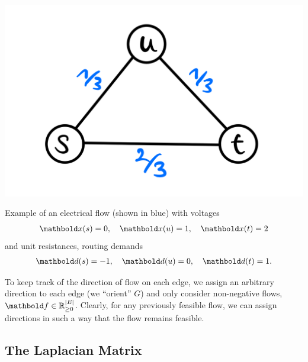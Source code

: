 \begin{marginfigure}
    \includegraphics[width=\textwidth]{notes/figures/electrical_flows.png}
    \caption{Example of an electrical flow (shown in blue) with voltages \begin{align*}
        \vx(s) = 0,\quad \vx(u) = 1,\quad \vx(t) = 2
    \end{align*} and unit resistances, routing demands \begin{align*}
        \vd(s) = -1,\quad \vd(u) = 0,\quad \vd(t) = 1.
    \end{align*}}
\end{marginfigure}

To keep track of the direction of flow on each edge, we assign an arbitrary direction to each edge (we ``orient'' $G$) and only consider non-negative flows, $\vf \in \R_{\geq 0}^{|\sE|}$. Clearly, for any previously feasible flow, we can assign directions in such a way that the flow remains feasible.

\subsection{The Laplacian Matrix}

